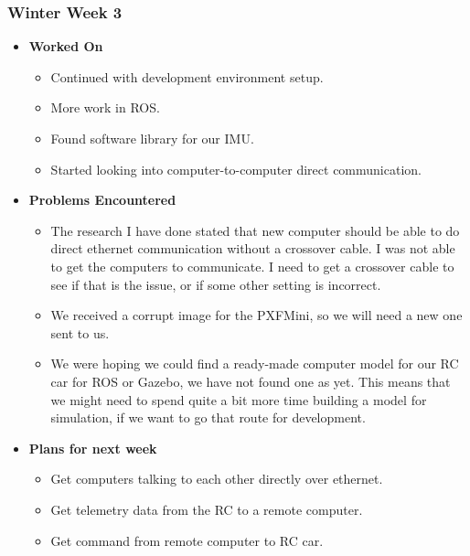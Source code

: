 \documentclass[compsoc,draftclsnofoot,onecolumn,10pt]{IEEEtran}
\begin{document}
\subsubsection{Winter Week 3}
\begin{itemize}
    \item {\textbf{Worked On}}
    \begin{itemize}
        \item Continued with development environment setup.
        \item More work in ROS.
        \item Found software library for our IMU.
        \item Started looking into computer-to-computer direct communication.
    \end{itemize}

    \item {\textbf{Problems Encountered}}
    \begin{itemize}
        \item The research I have done stated that new computer should be able to do direct ethernet communication without a crossover cable. I was not able to get the computers to communicate. I need to get a crossover cable to see if that is the issue, or if some other setting is incorrect.
        \item We received a corrupt image for the PXFMini, so we will need a new one sent to us.
        \item We were hoping we could find a ready-made computer model for our RC car for ROS or Gazebo, we have not found one as yet. This means that we might need to spend quite a bit more time building a model for simulation, if we want to go that route for development.
    \end{itemize}

    \item{\textbf{Plans for next week}}
    \begin{itemize}
        \item Get computers talking to each other directly over ethernet.
        \item Get telemetry data from the RC to a remote computer.
        \item Get command from remote computer to RC car.
    \end{itemize}
\end{itemize}
\end{document}

